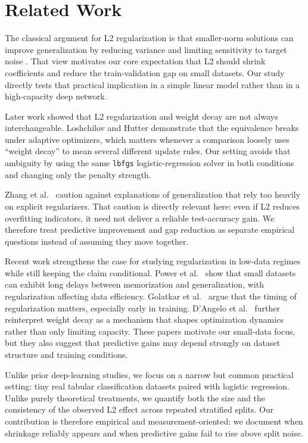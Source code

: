 \section{Related Work}
\label{sec:related_work}

 The classical argument for L2 regularization is that smaller-norm solutions can improve generalization by reducing variance and limiting sensitivity to target noise \cite{krogh1991simple}. That view motivates our core expectation that L2 should shrink coefficients and reduce the train-validation gap on small datasets. Our study directly tests that practical implication in a simple linear model rather than in a high-capacity deep network.

 Later work showed that L2 regularization and weight decay are not always interchangeable. Loshchilov and Hutter \cite{loshchilov2019decoupled} demonstrate that the equivalence breaks under adaptive optimizers, which matters whenever a comparison loosely uses ``weight decay'' to mean several different update rules. Our setting avoids that ambiguity by using the same \texttt{lbfgs} logistic-regression solver in both conditions and changing only the penalty strength.

 Zhang et al.\ \cite{zhang2017understanding} caution against explanations of generalization that rely too heavily on explicit regularizers. That caution is directly relevant here: even if L2 reduces overfitting indicators, it need not deliver a reliable test-accuracy gain. We therefore treat predictive improvement and gap reduction as separate empirical questions instead of assuming they move together.

 Recent work strengthens the case for studying regularization in low-data regimes while still keeping the claim conditional. Power et al.\ \cite{power2022grokking} show that small datasets can exhibit long delays between memorization and generalization, with regularization affecting data efficiency. Golatkar et al.\ \cite{golatkar2019time} argue that the timing of regularization matters, especially early in training. D'Angelo et al.\ \cite{dangelo2024weight} further reinterpret weight decay as a mechanism that shapes optimization dynamics rather than only limiting capacity. These papers motivate our small-data focus, but they also suggest that predictive gains may depend strongly on dataset structure and training conditions.

 Unlike prior deep-learning studies, we focus on a narrow but common practical setting: tiny real tabular classification datasets paired with logistic regression. Unlike purely theoretical treatments, we quantify both the size and the consistency of the observed L2 effect across repeated stratified splits. Our contribution is therefore empirical and measurement-oriented: we document when shrinkage reliably appears and when predictive gains fail to rise above split noise.
